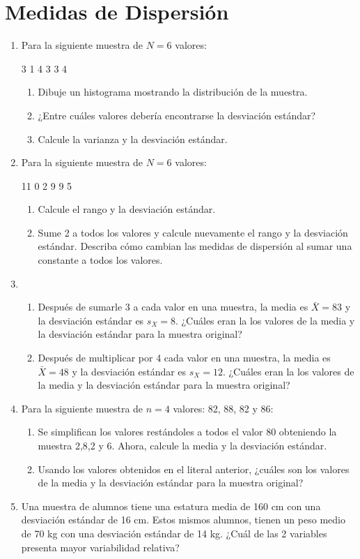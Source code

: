 \documentclass[letterpaper]{article}
\begin{document}
\section{Medidas de Dispersión}
\begin{enumerate}
	\item Para la siguiente muestra de $N=6$ valores: \\
	\begin{center}
		3 1 4 3 3 4
	\end{center}
	\begin{enumerate}
		\item Dibuje un histograma mostrando la distribución de la muestra.
		\item ¿Entre cuáles valores debería encontrarse la desviación estándar?
		\item Calcule la varianza y la desviación estándar. 
	\end{enumerate}
	\item Para la siguiente muestra de $N=6$ valores: \\
	\begin{center}
		11 0 2 9 9 5
	\end{center}
	\begin{enumerate}
		\item Calcule el rango y la desviación estándar.
		\item Sume 2 a todos los valores y calcule nuevamente el rango y la desviación estándar. Describa cómo cambian las medidas de dispersión al sumar una constante a todos los valores.
	\end{enumerate}
	\item 
	\begin{enumerate}
		\item Después de sumarle 3 a cada valor en
		una muestra, la media es $\bar{X}=83$ y
		la desviación estándar es $s_X=8$. ¿Cuáles eran la
		los valores de la media y la desviación estándar para
		la muestra original?
		\item Después de multiplicar por 4 cada valor en
		una muestra, la media es $\bar{X}=48$ y
		la desviación estándar es $s_X=12$. ¿Cuáles eran la
		los valores de la media y la desviación estándar para
		la muestra original?
	\end{enumerate}
	
	\item Para la siguiente muestra de $n=4$ valores: 82, 88, 82 y 86:
	\begin{enumerate}
		\item Se simplifican los valores restándoles a todos el valor 80 obteniendo la muestra 2,8,2 y 6. Ahora, calcule la media y la desviación estándar.
		\item Usando los valores obtenidos en el literal anterior, ¿cuáles son los valores de la media y la desviación estándar para la muestra original?
	\end{enumerate}
\item Una muestra de alumnos tiene una estatura media de 160 cm con una desviación estándar de 16 cm. Estos mismos alumnos, tienen un peso medio de 70 kg con una desviación estándar de 14 kg. ¿Cuál de las 2 variables presenta mayor variabilidad relativa?
\end{enumerate}
\end{document}
